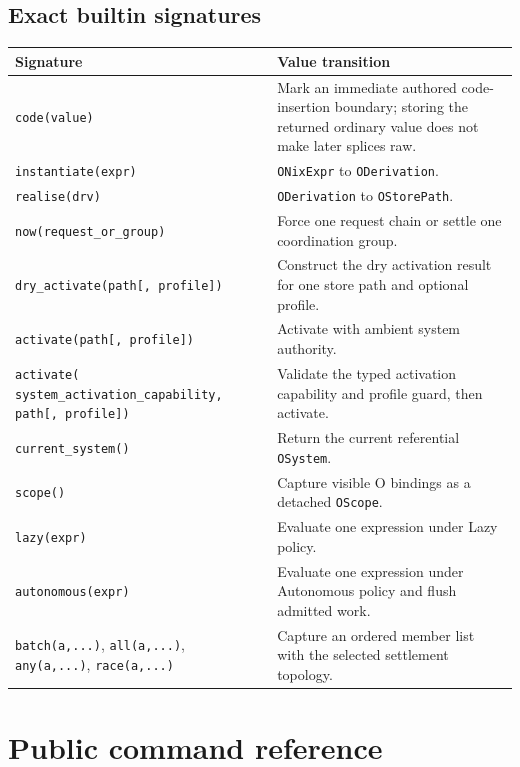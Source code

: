 \documentclass[11pt,oneside]{article}
\begin{document}
\subsection{Exact builtin signatures}

\begin{longtable}{P{0.38\textwidth} P{0.54\textwidth}}
\toprule
\textbf{Signature} & \textbf{Value transition} \\
\midrule
\endhead
\texttt{code(value)} & Mark an immediate authored code-insertion boundary;
storing the returned ordinary value does not make later splices raw. \\
\texttt{instantiate(expr)} & \texttt{ONixExpr} to
\texttt{ODerivation}. \\
\texttt{realise(drv)} & \texttt{ODerivation} to
\texttt{OStorePath}. \\
\texttt{now(request\_or\_group)} & Force one request chain or settle one
coordination group. \\
\texttt{dry\_activate(path[, profile])} & Construct the dry activation result
for one store path and optional profile. \\
\texttt{activate(path[, profile])} & Activate with ambient system authority. \\
\texttt{activate(}\newline
\texttt{system\_activation\_capability,}\newline
\texttt{path[, profile])} & Validate the typed activation capability and
profile guard, then activate. \\
\texttt{current\_system()} & Return the current referential
\texttt{OSystem}. \\
\texttt{scope()} & Capture visible O bindings as a detached
\texttt{OScope}. \\
\texttt{lazy(expr)} & Evaluate one expression under Lazy policy. \\
\texttt{autonomous(expr)} & Evaluate one expression under Autonomous policy
and flush admitted work. \\
\texttt{batch(a,...)}, \texttt{all(a,...)}, \texttt{any(a,...)},
\texttt{race(a,...)} & Capture an ordered member list with the selected
settlement topology. \\
\bottomrule
\end{longtable}

\section{Public command reference}
\end{document}

